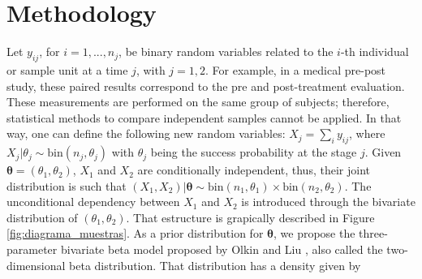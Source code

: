 \documentclass[AMA,Times1COL]{WileyNJDv5} %
\newcommand{\bX}{\boldsymbol{\mathrm{X}}}
\begin{document}
\section{Methodology}\label{sec1a}

Let $y_{ij}$, for $i = 1,..., n_j$, be binary random variables related to the $i$-th individual or sample unit at a time $j$, with $j = 1,2$. For example, in a medical pre-post study, these paired results correspond to the pre and post-treatment evaluation. These measurements are performed on the same group of subjects; therefore, statistical methods to compare independent samples cannot be applied. In that way, one can define the following new random variables: $X_{j}=\sum _{i} y_{ij}$, where $X_{j}\vert \theta_j \sim \text{bin} (n_j,\theta_j)$ with $\theta_j$ being the success probability at the stage $j$. Given $\boldsymbol{\theta}=(\theta_1,\theta_2)$, $X_{1}$ and $X_{2}$ are conditionally independent, thus, their joint distribution is such that $(X_{1}, X_{2}) \vert \boldsymbol{\theta} \sim \text{bin} (n_1,\theta_1) \times \text{bin} (n_2,\theta_2)$. The unconditional dependency between $X_{1}$ and $X_{2}$ is introduced through the bivariate distribution of $(\theta_1,\theta_2)$. That estructure is grapically described in Figure \ref{fig:diagrama_muestras}. As a prior distribution for $\boldsymbol{\theta}$, we propose the three-parameter bivariate beta model proposed by Olkin and Liu \cite{Olkin03}, also called the two-dimensional beta distribution. That distribution has a
density given by  

\end{document}

